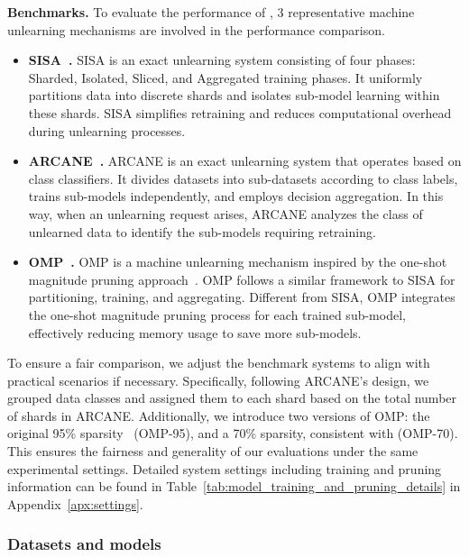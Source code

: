 \documentclass[conference,compsoc]{IEEEtran}
\begin{document}
\noindent \textbf{Benchmarks.}
To evaluate the performance of \tool, 3 representative machine unlearning mechanisms are involved in the performance comparison.
\begin{itemize}[leftmargin=*, noitemsep]
\item \textbf{SISA~\cite{bourtoule2021machine}.} SISA is an exact unlearning system consisting of four phases: Sharded, Isolated, Sliced, and Aggregated training phases. It uniformly partitions data into discrete shards and isolates sub-model learning within these shards. SISA simplifies retraining and reduces computational overhead during unlearning processes. 
\item \textbf{ARCANE~\cite{yan2022arcane}.} ARCANE is an exact unlearning system that operates based on class classifiers. It divides datasets into sub-datasets according to class labels, trains sub-models independently, and employs decision aggregation. In this way, when an unlearning request arises, ARCANE analyzes the class of unlearned data to identify the sub-models requiring retraining.
\item \textbf{OMP~\cite{liu2024model}.} OMP is a machine unlearning mechanism inspired by the one-shot magnitude pruning approach~\cite{liu2024model}. OMP follows a similar framework to SISA for partitioning, training, and aggregating. Different from SISA, OMP integrates the one-shot magnitude pruning process for each trained sub-model, effectively reducing memory usage to save more sub-models.
\end{itemize}

To ensure a fair comparison, we adjust the benchmark systems to align with practical scenarios if necessary. Specifically, following ARCANE's design, we grouped data classes and assigned them to each shard based on the total number of shards in ARCANE. Additionally, we introduce two versions of OMP: the original 95\% sparsity~\cite{liu2024model} (OMP-95), and a 70\% sparsity, consistent with \tool (OMP-70). This ensures the fairness and generality of our evaluations under the same experimental settings. Detailed system settings including training and pruning information can be found in Table~\ref{tab:model_training_and_pruning_details} in Appendix~\ref{apx:settings}. 



\subsubsection{Datasets and models}
\label{subsubsec:dm}
\end{document}
